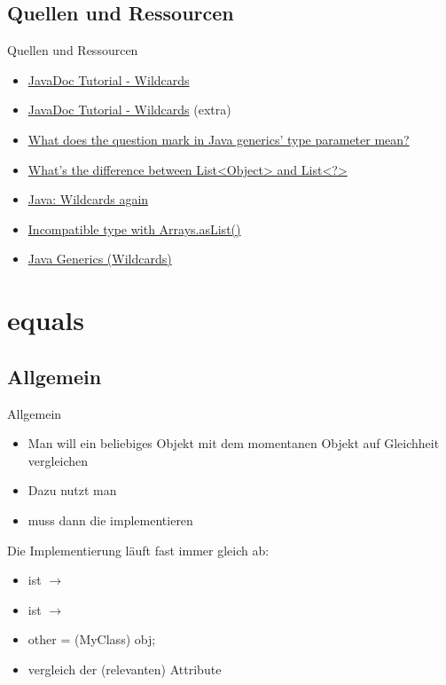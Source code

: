 \documentclass[usepdftitle=false,hyperref={pdfpagelabels=false}]{beamer}
\begin{document}
\subsection{Quellen und Ressourcen}
\begin{frame}{Quellen und Ressourcen}
    \begin{itemize}
        \item \href{http://docs.oracle.com/javase/tutorial/java/generics/wildcards.html}{JavaDoc Tutorial - Wildcards}
        \item \href{http://docs.oracle.com/javase/tutorial/extra/generics/wildcards.html}{JavaDoc Tutorial - Wildcards} (extra)
        \item \href{http://stackoverflow.com/q/3009745/562769}{What does the question mark in Java generics' type parameter mean?}
        \item \href{http://stackoverflow.com/q/12340808/562769}{What's the difference between List<Object> and List<?>}
        \item \href{http://stackoverflow.com/q/12348777/562769}{Java: Wildcards again}
        \item \href{http://stackoverflow.com/q/14091771/562769}{Incompatible type with Arrays.asList()}
        \item \href{http://stackoverflow.com/q/252055/562769}{Java Generics (Wildcards)}
    \end{itemize}
\end{frame}

\section{equals}
\subsection{Allgemein}
\begin{frame}{Allgemein}
    \begin{itemize}[<+->]
        \item Man will ein beliebiges Objekt mit dem momentanen
              Objekt auf Gleichheit vergleichen
        \item Dazu nutzt man 
        \item {} muss dann die  implementieren
    \end{itemize}

    Die Implementierung läuft fast immer gleich ab:
    \begin{itemize}[<+->]
        \item ist  $\rightarrow$ 
        \item ist  $\rightarrow$ 
        \item other = (MyClass) obj;
        \item vergleich der (relevanten) Attribute
    \end{itemize}
\end{frame}
\end{document}
